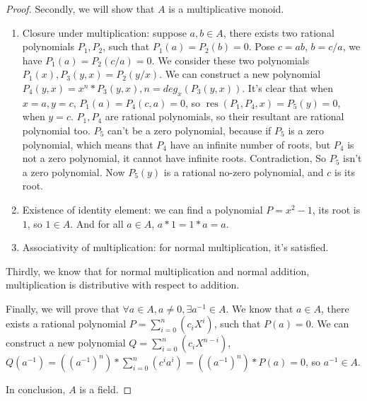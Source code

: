 \documentclass{article}
\begin{document}
\begin{proof}
    Secondly, we will show that \(A\) is a multiplicative monoid.
    \begin{enumerate}
        \item Closure under multiplication: suppose \(a,b \in A\), there exists two rational polynomials \(P_{1}, P_{2}\), such that \(P_{1}(a) = P_{2}(b) = 0\). Pose \(c = ab\), \(b = c/a\), we have \(P_{1}(a) = P_{2}(c/a) = 0\). We consider these two polynomials \(P_{1}(x), P_{3}(y,x) = P_{2}(y/x)\). We can construct a new polynomial \(P_{4}(y,x) = x^{n}*P_{3}(y,x), n = deg_{x}(P_{3}(y,x))\). It's clear that when \(x = a, y = c\), \(P_{1}(a) = P_{4}(c,a) = 0\), so \(\operatorname{res}(P_{1}, P_{4},x) = P_{5}(y) = 0\), when \(y = c\). \(P_{1}, P_{4}\) are rational polynomials, so their resultant are rational polynomial too. \(P_{5}\) can't be a zero polynomial, because if \(P_{5}\) is a zero polynomial, which means that \(P_{4}\) have an infinite number of roots, but \(P_{4}\) is not a zero polynomial, it cannot have infinite roots. Contradiction, So \(P_{5}\) isn't a zero polynomial. Now \(P_{5}(y)\) is a rational no-zero polynomial, and \(c\) is its root.
        \item Existence of identity element: we can find a polynomial \(P = x^{2}-1\), its root is \(1\), so \(1 \in A\). And for all \(a \in A\), \(a * 1 = 1*a = a\).
        \item Associativity of multiplication: for normal multiplication, it's satisfied.
    \end{enumerate}

    Thirdly, we know that for normal multiplication and normal addition, multiplication is distributive with respect to addition. 

    Finally, we will prove that \(\forall a \in A, a \neq 0, \exists a^{-1} \in A\). We know that \(a \in A\), there exists a rational polynomial \(P = \sum_{i=0}^{n}(c_{i}X^{i})\), such that \(P(a) = 0\). We can construct a new polynomial \(Q = \sum_{i=0}^{n}(c_{i}X^{n-i})\), \(Q(a^{-1}) = ({(a^{-1})}^{n})*\sum_{i=0}^{n}(c^{i}a^{i}) = ({(a^{-1})}^{n})* P(a) = 0\), so \(a^{-1} \in A\).

    In conclusion, \(A\) is a field.
\end{proof}
\end{document}
